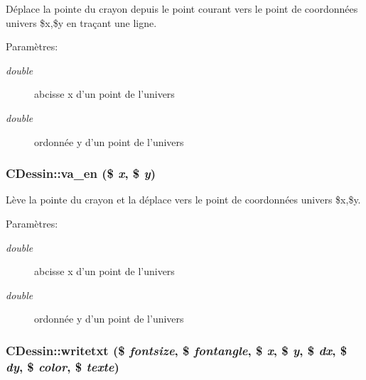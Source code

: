 D\'{e}place la pointe du crayon depuis le point courant vers le point de coordonn\'{e}es univers \$x,\$y en tra\c{c}ant une ligne. \begin{Desc}
\item[Param\`{e}tres:]
\begin{description}
\item[{\em double}]abcisse x d'un point de l'univers \item[{\em double}]ordonn\'{e}e y d'un point de l'univers\end{description}
\end{Desc}
\hypertarget{classCDessin_a7}{
\subsubsection[va\_\-en]{\setlength{\rightskip}{0pt plus 5cm}CDessin::va\_\-en (\$ {\em x}, \$ {\em y})}}
\label{classCDessin_a7}


L\`{e}ve la pointe du crayon et la d\'{e}place vers le point de coordonn\'{e}es univers \$x,\$y. \begin{Desc}
\item[Param\`{e}tres:]
\begin{description}
\item[{\em double}]abcisse x d'un point de l'univers \item[{\em double}]ordonn\'{e}e y d'un point de l'univers\end{description}
\end{Desc}
\hypertarget{classCDessin_a11}{
\subsubsection[writetxt]{\setlength{\rightskip}{0pt plus 5cm}CDessin::writetxt (\$ {\em fontsize}, \$ {\em fontangle}, \$ {\em x}, \$ {\em y}, \$ {\em dx}, \$ {\em dy}, \$ {\em color}, \$ {\em texte})}}
\label{classCDessin_a11}


